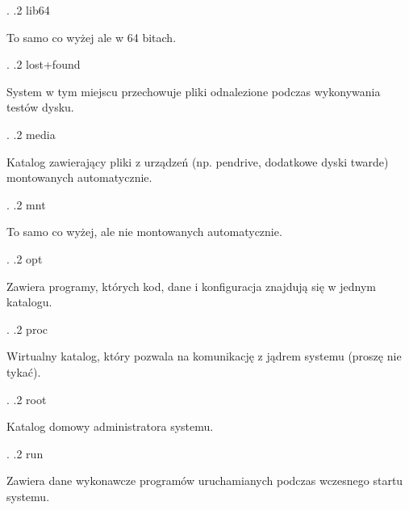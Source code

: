\documentclass[12pt]{article}
\begin{document}
{\begin{minipage}[t]{0.5\textwidth}
            \vspace{\baselineskip}
        \end{minipage}.
        .2 lib64 \dotfill \begin{minipage}[t]{0.5\textwidth}
            \textnormal{To samo co wyżej ale w 64 bitach.}
            \vspace{\baselineskip}
        \end{minipage}.
        .2 lost+found \dotfill \begin{minipage}[t]{0.5\textwidth}
            \textnormal{System w tym miejscu przechowuje pliki odnalezione podczas wykonywania testów dysku. }
            \vspace{\baselineskip}
        \end{minipage}.
        .2 media \dotfill \begin{minipage}[t]{0.5\textwidth}
            \textnormal{Katalog zawierający pliki z urządzeń (np. pendrive, dodatkowe dyski twarde) montowanych automatycznie.}
            \vspace{\baselineskip}
        \end{minipage}.
        .2 mnt \dotfill \begin{minipage}[t]{0.5\textwidth}
            \textnormal{To samo co wyżej, ale nie montowanych automatycznie.}
            \vspace{\baselineskip}
        \end{minipage}.
        .2 opt \dotfill \begin{minipage}[t]{0.5\textwidth}
            \textnormal{Zawiera programy, których kod, dane i konfiguracja znajdują się w jednym katalogu.}
            \vspace{\baselineskip}
        \end{minipage}.
        .2 proc \dotfill \begin{minipage}[t]{0.5\textwidth}
            \textnormal{Wirtualny katalog, który pozwala na komunikację z jądrem  systemu (proszę nie tykać).}
            \vspace{\baselineskip}
        \end{minipage}.
        .2 root \dotfill \begin{minipage}[t]{0.5\textwidth}
            \textnormal{Katalog domowy administratora systemu.}
            \vspace{\baselineskip}
        \end{minipage}.
        .2 run \dotfill \begin{minipage}[t]{0.5\textwidth}
            \textnormal{Zawiera dane wykonawcze programów uruchamianych podczas wczesnego startu systemu.}

\end{minipage}}
\end{document}
